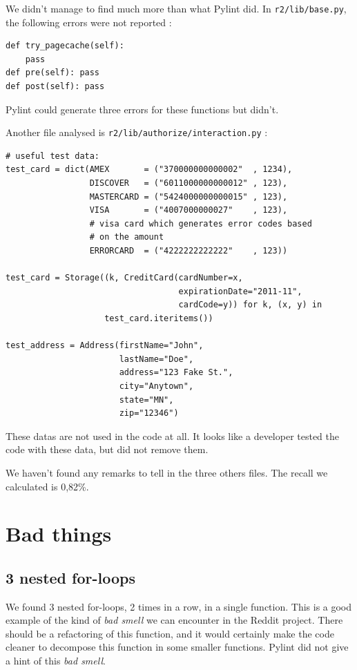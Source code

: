\documentclass[11pt, a4paper]{article}
\newcommand{\tit}[1]{\textit{#1}}
\newcommand{\pyl}{\textsf{Pylint}}
\begin{document}
We didn't manage to find much more than what Pylint did.
In \texttt{r2/lib/base.py}, the following errors were not reported :

\begin{lstlisting}[caption= 3 useless functions]
def try_pagecache(self):
    pass
def pre(self): pass
def post(self): pass
\end{lstlisting}

\medskip
\pyl{} could generate three errors for these functions but didn't.


Another file analysed is \texttt{r2/lib/authorize/interaction.py} :

\begin{lstlisting}[caption= test data in the file..]
# useful test data:
test_card = dict(AMEX       = ("370000000000002"  , 1234),
                 DISCOVER   = ("6011000000000012" , 123),
                 MASTERCARD = ("5424000000000015" , 123),
                 VISA       = ("4007000000027"    , 123),
                 # visa card which generates error codes based
                 # on the amount
                 ERRORCARD  = ("4222222222222"    , 123))

test_card = Storage((k, CreditCard(cardNumber=x,
                                   expirationDate="2011-11",
                                   cardCode=y)) for k, (x, y) in
                    test_card.iteritems())

test_address = Address(firstName="John",
                       lastName="Doe",
                       address="123 Fake St.",
                       city="Anytown",
                       state="MN",
                       zip="12346")
\end{lstlisting}

These datas are not used in the code at all.
It looks like a developer tested the code with these data, but did not remove them.

We haven't found any remarks to tell in the three others files. The recall we calculated is 0,82\%.


\section{Bad things}

\subsection{3 nested for-loops}

We found 3 nested for-loops, 2 times in a row, in a single function.
This is a good example of the kind of \tit{bad smell} we can encounter in the Reddit project.
There should be a refactoring of this function, and it would certainly make the code cleaner to decompose this function in some smaller functions.
\pyl{} did not give a hint of this \tit{bad smell}.
\end{document}
